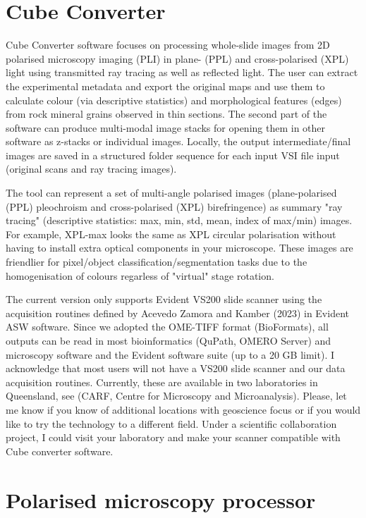 \section{Cube Converter}
\label{chap:repo1}
	
	Cube Converter software focuses on processing whole-slide images from 2D polarised microscopy imaging (PLI) in plane- (PPL) and cross-polarised (XPL) light using transmitted ray tracing as well as reflected light. The user can extract the experimental metadata and export the original maps and use them to calculate colour (via descriptive statistics) and morphological features (edges) from rock mineral grains observed in thin sections. The second part of the software can produce multi-modal image stacks for opening them in other software as z-stacks or individual images. Locally, the output intermediate/final images are saved in a structured folder sequence for each input VSI file input (original scans and ray tracing images).
	
	The tool can represent a set of multi-angle polarised images (plane-polarised (PPL) pleochroism and cross-polarised (XPL) birefringence) as summary "ray tracing" (descriptive statistics: max, min, std, mean, index of max/min) images. For example, XPL-max looks the same as XPL circular polarisation without having to install extra optical components in your microscope. These images are friendlier for pixel/object classification/segmentation tasks due to the homogenisation of colours regarless of "virtual" stage rotation.
		
	The current version only supports Evident VS200 slide scanner using the acquisition routines defined by Acevedo Zamora and Kamber (2023) in Evident ASW software. Since we adopted the OME-TIFF format (BioFormats), all outputs can be read in most bioinformatics (QuPath, OMERO Server) and microscopy software and the Evident software suite (up to a 20 GB limit). I acknowledge that most users will not have a VS200 slide scanner and our data acquisition routines. Currently, these are available in two laboratories in Queensland, see (CARF, Centre for Microscopy and Microanalysis). Please, let me know if you know of additional locations with geoscience focus or if you would like to try the technology to a different field. Under a scientific collaboration project, I could visit your laboratory and make your scanner compatible with Cube converter software. 	
		
	\section{Polarised microscopy processor}		
	
